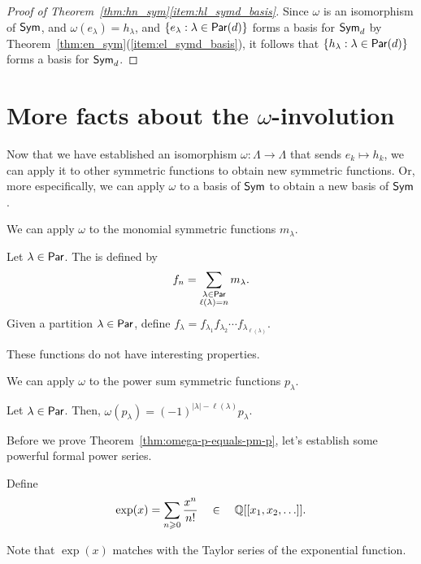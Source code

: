 \begin{proof}[Proof of Theorem~\ref{thm:hn_sym}\ref{item:hl_symd_basis}]
    Since \(\omega\) is an isomorphism of \(\operatorname{\mathsf{Sym}}\), and \(\omega(e_\lambda) = h_\lambda\), and \(\{e_\lambda : \lambda \in \operatorname{\mathsf{Par}}(d)\}\) forms a basis for \(\operatorname{\mathsf{Sym}}_d\) by Theorem~\ref{thm:en_sym}(\ref{item:el_symd_basis}), it follows that \(\{h_\lambda : \lambda \in \operatorname{\mathsf{Par}}(d)\}\) forms a basis for \(\operatorname{\mathsf{Sym}}_d\).
\end{proof}

\section{More facts about the \(\omega\)-involution}

Now that we have established an isomorphism \(\omega: \Lambda \to \Lambda\) that sends \(e_k \mapsto h_k\),
we can apply it to other symmetric functions to obtain new symmetric functions.
Or, more especifically, we can apply \(\omega\) to a basis of \(\operatorname{\mathsf{Sym}}\) to obtain a new basis of \(\operatorname{\mathsf{Sym}}\).

We can apply \(\omega\) to the monomial symmetric functions \(m_\lambda\).

\begin{definition}
		Let \(\lambda \in \operatorname{\mathsf{Par}}\).
	The  is defined by
	\begin{equation}
		f_n = \sum_{\substack{\lambda \in \operatorname{\mathsf{Par}} \\ \ell(\lambda) = n}} m_\lambda.
	\end{equation}
	Given a partition \(\lambda \in \operatorname{\mathsf{Par}}\), define \(f_\lambda = f_{\lambda_1}f_{\lambda_2}\cdots f_{\lambda_{\ell(\lambda)}}\).	
\end{definition}

These functions do not have interesting properties.

We can apply \(\omega\) to the power sum symmetric functions \(p_\lambda\).

\begin{theorem} \label{thm:omega-p-equals-pm-p}
	Let \(\lambda \in \operatorname{\mathsf{Par}}\).
	Then, \(\omega(p_\lambda) = (-1)^{|\lambda|-\ell(\lambda)} p_{\lambda}\).
\end{theorem}

Before we prove Theorem~\ref{thm:omega-p-equals-pm-p},
let's establish some powerful formal power series.

\begin{definition}
	Define
	\begin{equation}
		\exp(x) = \sum_{n \geqslant 0} \frac{x^n}{n!} \quad \in \quad \mathbb{Q}[[x_1, x_2, \ldots]].
	\end{equation}
\end{definition}
Note that \(\exp(x)\) matches with the Taylor series of the exponential function.

